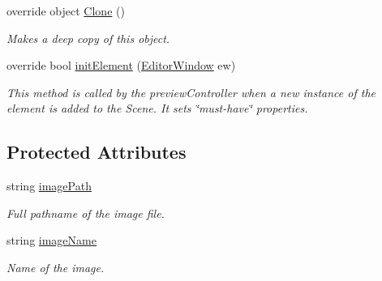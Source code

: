 \begin{DoxyCompactItemize}
override object \hyperlink{class_a_rdev_kit_1_1_model_1_1_project_1_1_image_trackable_a9f0502ccb4306c88c4b15793b0d1c0ba}{Clone} ()
\begin{DoxyCompactList}\small\item\em Makes a deep copy of this object. \end{DoxyCompactList}\item 
override bool \hyperlink{class_a_rdev_kit_1_1_model_1_1_project_1_1_image_trackable_a90714d32f49a982fdbe39a84abd41704}{init\-Element} (\hyperlink{class_a_rdev_kit_1_1_editor_window}{Editor\-Window} ew)
\begin{DoxyCompactList}\small\item\em This method is called by the preview\-Controller when a new instance of the element is added to the Scene. It sets \char`\"{}must-\/have\char`\"{} properties. \end{DoxyCompactList}\end{DoxyCompactItemize}
\subsection*{Protected Attributes}
\begin{DoxyCompactItemize}
\item 
string \hyperlink{class_a_rdev_kit_1_1_model_1_1_project_1_1_image_trackable_a1da6761ca1dd74ff7981d0b19774de99}{image\-Path}
\begin{DoxyCompactList}\small\item\em Full pathname of the image file. \end{DoxyCompactList}\item 
string \hyperlink{class_a_rdev_kit_1_1_model_1_1_project_1_1_image_trackable_a5395f501dfd3575778147f1cfc4b4e39}{image\-Name}
\begin{DoxyCompactList}\small\item\em Name of the image. \end{DoxyCompactList}\end{DoxyCompactItemize}
